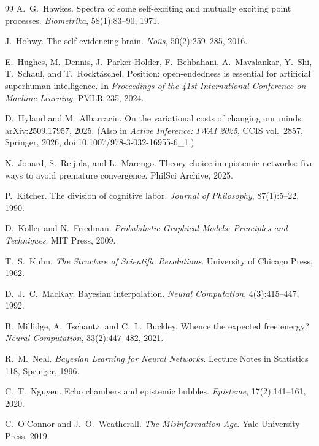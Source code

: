 \documentclass[runningheads]{llncs}
\begin{document}
\begin{thebibliography}{99}
A.~G.~Hawkes.
Spectra of some self-exciting and mutually exciting point processes.
\emph{Biometrika}, 58(1):83--90, 1971.

J.~Hohwy.
The self-evidencing brain. \emph{No\^us}, 50(2):259--285, 2016.

E.~Hughes, M.~Dennis, J.~Parker-Holder, F.~Behbahani, A.~Mavalankar, Y.~Shi, T.~Schaul, and
T.~Rockt\"aschel.
Position: open-endedness is essential for artificial superhuman intelligence.
In \emph{Proceedings of the 41st International Conference on Machine Learning}, PMLR 235, 2024.

D.~Hyland and M.~Albarracin.
On the variational costs of changing our minds. arXiv:2509.17957, 2025.
(Also in \emph{Active Inference: IWAI 2025}, CCIS vol.~2857, Springer, 2026,
doi:10.1007/978-3-032-16955-6\_1.)

N.~Jonard, S.~Reijula, and L.~Marengo.
Theory choice in epistemic networks: five ways to avoid premature convergence. PhilSci Archive, 2025.

P.~Kitcher.
The division of cognitive labor. \emph{Journal of Philosophy}, 87(1):5--22, 1990.

D.~Koller and N.~Friedman.
\emph{Probabilistic Graphical Models: Principles and Techniques}. MIT Press, 2009.

T.~S.~Kuhn.
\emph{The Structure of Scientific Revolutions}. University of Chicago Press, 1962.

D.~J.~C.~MacKay.
Bayesian interpolation. \emph{Neural Computation}, 4(3):415--447, 1992.

B.~Millidge, A.~Tschantz, and C.~L.~Buckley.
Whence the expected free energy? \emph{Neural Computation}, 33(2):447--482, 2021.

R.~M.~Neal.
\emph{Bayesian Learning for Neural Networks}.
Lecture Notes in Statistics 118, Springer, 1996.

C.~T.~Nguyen.
Echo chambers and epistemic bubbles. \emph{Episteme}, 17(2):141--161, 2020.

C.~O'Connor and J.~O.~Weatherall.
\emph{The Misinformation Age}. Yale University Press, 2019.


\end{thebibliography}
\end{document}
